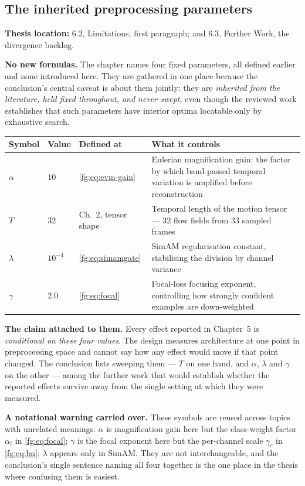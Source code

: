 \documentclass[11pt,a4paper]{article}
\numberwithin{equation}{section}
\begin{document}
\subsection{The inherited preprocessing parameters}
\label{fg6:inherited}
\textbf{Thesis location:} 6.2, Limitations, first paragraph; and 6.3, Further
Work, the divergence backlog.

\textbf{No new formulas.} The chapter names four fixed parameters, all
defined earlier and none introduced here. They are gathered in one place
because the conclusion's central caveat is about them jointly: they are
\emph{inherited from the literature, held fixed throughout, and never swept},
even though the reviewed work establishes that such parameters have interior
optima locatable only by exhaustive search.

\begin{center}
\begin{tabular}{@{}l l l p{5.4cm}@{}}
\hline
\textbf{Symbol} & \textbf{Value} & \textbf{Defined at} & \textbf{What it controls} \\
\hline
$\alpha$  & 10        & \eqref{fg:eq:evm-gain}  & Eulerian magnification gain: the factor by which band-passed temporal variation is amplified before reconstruction \\
$T$       & 32        & Ch.\ 2, tensor shape & Temporal length of the motion tensor --- 32 flow fields from 33 sampled frames \\
$\lambda$ & $10^{-4}$ & \eqref{fg:eq:simamgate} & SimAM regularisation constant, stabilising the division by channel variance \\
$\gamma$  & 2.0       & \eqref{fg:eq:focal} & Focal-loss focusing exponent, controlling how strongly confident examples are down-weighted \\
\hline
\end{tabular}
\end{center}

\textbf{The claim attached to them.} Every effect reported in Chapter~5 is
\emph{conditional on these four values}. The design measures architecture at
one point in preprocessing space and cannot say how any effect would move if
that point changed. The conclusion lists sweeping them --- $T$ on one hand,
and $\alpha$, $\lambda$ and $\gamma$ on the other --- among the further work
that would establish whether the reported effects survive away from the single
setting at which they were measured.

\textbf{A notational warning carried over.} These symbols are reused across
topics with unrelated meanings. $\alpha$ is magnification gain here but the
class-weight factor $\alpha_t$ in \eqref{fg:eq:focal}; $\gamma$ is the focal
exponent here but the per-channel scale $\gamma_c$ in \eqref{fg:eq:bn};
$\lambda$ appears only in SimAM. They are not interchangeable, and the
conclusion's single sentence naming all four together is the one place in the
thesis where confusing them is easiest.
\end{document}
